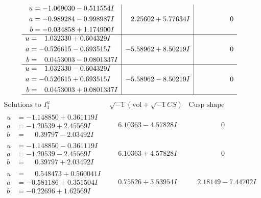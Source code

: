 \documentclass[1p]{elsarticle_modified}
\theoremstyle{definition}
\newcommand{\I}{\sqrt{-1}}
\begin{document}
$$\begin{array}{c|c|c}
\begin{aligned}
u &= -1.069030 - 0.511554 I \\
a &= -0.989284 - 0.998987 I \\
b &= -0.034858 + 1.174900 I\end{aligned}
 & \phantom{-}2.25602 + 5.77634 I & \phantom{-0.000000 } 0 \\ \hline\begin{aligned}
u &= \phantom{-}1.032330 + 0.604329 I \\
a &= -0.526615 - 0.693515 I \\
b &= \phantom{-}0.0453003 - 0.0801337 I\end{aligned}
 & -5.58962 + 8.50219 I & \phantom{-0.000000 } 0 \\ \hline\begin{aligned}
u &= \phantom{-}1.032330 - 0.604329 I \\
a &= -0.526615 + 0.693515 I \\
b &= \phantom{-}0.0453003 + 0.0801337 I\end{aligned}
 & -5.58962 - 8.50219 I & \phantom{-0.000000 } 0\\
 \hline 
 \end{array}$$\newpage$$\begin{array}{c|c|c}  
\text{Solutions to }I^u_{1}& \I (\text{vol} + \sqrt{-1}CS) & \text{Cusp shape}\\
 \hline 
\begin{aligned}
u &= -1.148850 + 0.361119 I \\
a &= -1.20539 + 2.45569 I \\
b &= \phantom{-}0.39797 - 2.03492 I\end{aligned}
 & \phantom{-}6.10363 - 4.57828 I & \phantom{-0.000000 } 0 \\ \hline\begin{aligned}
u &= -1.148850 - 0.361119 I \\
a &= -1.20539 - 2.45569 I \\
b &= \phantom{-}0.39797 + 2.03492 I\end{aligned}
 & \phantom{-}6.10363 + 4.57828 I & \phantom{-0.000000 } 0 \\ \hline\begin{aligned}
u &= \phantom{-}0.548473 + 0.560041 I \\
a &= -0.581186 + 0.351504 I \\
b &= -0.22696 + 1.62569 I\end{aligned}
 & \phantom{-}0.75526 + 3.53954 I & \phantom{-}2.18149 - 7.44702 I \\ \hline\begin{aligned}

\end{aligned}
\end{array}$$
\end{document}
